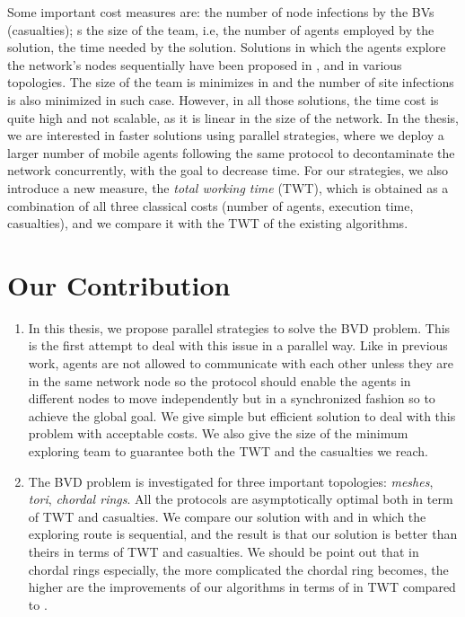 Some important cost measures are: 
 the number of node infections by the BVs (casualties); s
the size of the team, i.e, the number of agents employed by the solution, 
the time needed by the solution. 
Solutions in which the agents explore the network's nodes sequentially have been proposed in \cite{cai}, \cite{alotaibi} and \cite{cai1} in various topologies. The size of the team is minimizes in \cite{cai,cai1} and the number of site infections is also minimized in such case. However, in all those solutions, the time cost is quite high and not scalable, as it is linear in the size of the network.  In the thesis, we are interested in faster solutions using parallel strategies, where we deploy a larger number of mobile agents following the same protocol to decontaminate the network concurrently,  with the goal to  decrease time. For our strategies, we also introduce a new measure,   the {\em total working time} (TWT),  which is obtained as a combination of all three classical costs (number of agents,    execution time, casualties), and we compare it with the TWT of the existing algorithms.


\section{Our Contribution} 


\begin{enumerate}
\item In this thesis, we propose parallel strategies to solve the BVD problem. This is the first attempt to deal with this issue in a parallel way. Like in previous work, agents are not allowed to communicate with each other unless they are in the same network node so the protocol should enable the agents in different nodes to move independently but in  a synchronized fashion so to achieve the global goal.
We give simple but efficient solution to deal with this problem with acceptable costs. We also give the size of the minimum exploring team  to guarantee both the TWT and the  casualties we reach.  
\item The BVD problem is investigated for three important topologies: {\em meshes}, {\em tori}, {\em chordal rings}. All the protocols are asymptotically optimal both in term of TWT and casualties. We compare our solution with \cite{cai} and \cite{alotaibi} in which the exploring route is  sequential, and the result is that our solution is better than theirs in terms of TWT and casualties. We  should be point out that in chordal rings especially, the more complicated the chordal ring becomes, the higher are the improvements of our algorithms in terms of in TWT  compared to \cite{alotaibi}.
\end{enumerate}

